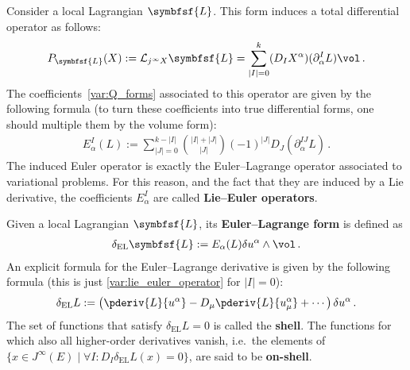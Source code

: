     \begin{example}
        Consider a local Lagrangian $\symbfsf{L}$. This form induces a total differential operator as follows:
        \begin{gather}
            P_{\symbfsf{L}}(X) := \mathcal{L}_{j^\infty X}\symbfsf{L} = \sum_{|I|=0}^k(D_IX^\alpha)(\partial^I_\alpha L)\vol\,.
        \end{gather}
        The coefficients~\eqref{var:Q_forms} associated to this operator are given by the following formula (to turn these coefficients into true differential forms, one should multiple them by the volume form):
        \begin{gather}
            \label{var:lie_euler_operator}
            E^I_\alpha(L) := \sum_{|J|=0}^{k-|I|}\binom{|I|+|J|}{|J|}(-1)^{|J|}D_J\left(\partial^{IJ}_\alpha L\right)\,.
        \end{gather}
        The induced Euler operator is exactly the Euler--Lagrange operator associated to variational problems. For this reason, and the fact that they are induced by a Lie derivative, the coefficients $E^I_\alpha$ are called \textbf{Lie--Euler operators}.

        Given a local Lagrangian $\symbfsf{L}$, its \textbf{Euler--Lagrange form} is defined as
        \begin{gather}
            \delta_{\text{EL}}\symbfsf{L} := E_\alpha(L)\delta u^\alpha\wedge\vol\,.
        \end{gather}
        An explicit formula for the Euler--Lagrange derivative is given by the following formula (this is just \cref{var:lie_euler_operator} for $|I|=0$):
        \begin{gather}
            \label{var:euler_lagrange_derivative}
            \delta_{\text{EL}}L := \left(\pderiv{L}{u^\alpha} - D_\mu\pderiv{L}{u^\alpha_\mu} + \cdots\right)\delta u^\alpha\,.
        \end{gather}
        The set of functions that satisfy $\delta_{\text{EL}}L=0$ is called the \textbf{shell}. The functions for which also all higher-order derivatives vanish, i.e.~the elements of $\{x\in J^\infty(E)\mid\forall I:D_I\delta_{\text{EL}}L(x) = 0\}$, are said to be \textbf{on-shell}.
    \end{example}

